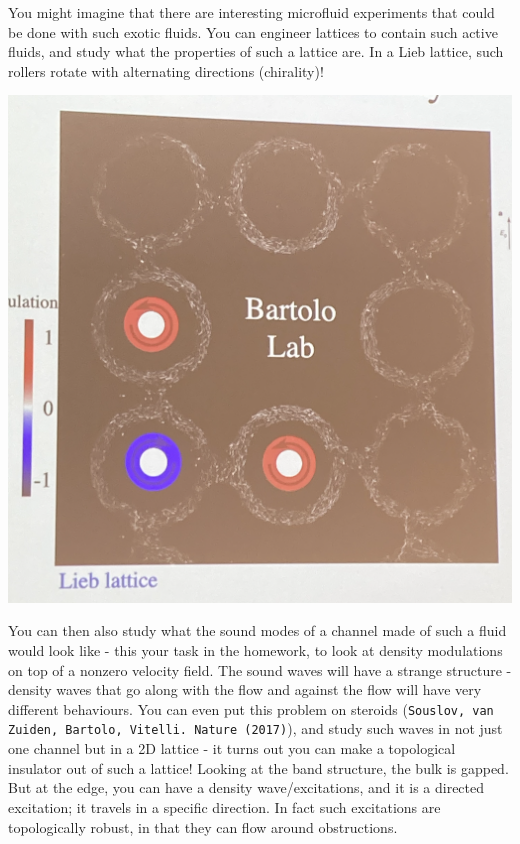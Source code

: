 You might imagine that there are interesting microfluid experiments that could be done with such exotic fluids. You can engineer lattices to contain such active fluids, and study what the properties of such a lattice are. In a Lieb lattice, such rollers rotate with alternating directions (chirality)! 

\begin{center}
    \includegraphics[scale=0.35]{Lectures/Images/lec8-circulation.png}
\end{center}

You can then also study what the sound modes of a channel made of such a fluid would look like - this your task in the homework, to look at density modulations on top of a nonzero velocity field. The sound waves will have a strange structure - density waves that go along with the flow and against the flow will have very different behaviours. You can even put this problem on steroids (\texttt{Souslov, van Zuiden, Bartolo, Vitelli.\ Nature (2017)}), and study such waves in not just one channel but in a 2D lattice - it turns out you can make a topological insulator out of such a lattice! Looking at the band structure, the bulk is gapped. But at the edge, you can have a density wave/excitations, and it is a directed excitation; it travels in a specific direction. In fact such excitations are topologically robust, in that they can flow around obstructions.

